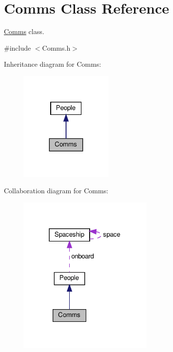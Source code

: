 \hypertarget{classComms}{}\section{Comms Class Reference}
\label{classComms}


\hyperlink{classComms}{Comms} class.  




{\ttfamily \#include $<$Comms.\+h$>$}



Inheritance diagram for Comms\+:\nopagebreak
\begin{figure}[H]
\begin{center}
\leavevmode
\includegraphics[width=131pt]{classComms__inherit__graph}
\end{center}
\end{figure}


Collaboration diagram for Comms\+:\nopagebreak
\begin{figure}[H]
\begin{center}
\leavevmode
\includegraphics[width=190pt]{classComms__coll__graph}
\end{center}
\end{figure}
